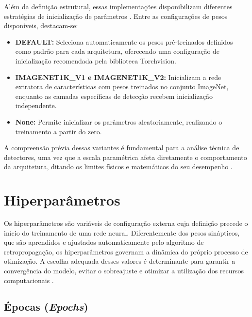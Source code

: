 Além da definição estrutural, essas implementações disponibilizam diferentes estratégias de
inicialização de parâmetros \cite{pytorch_torchvision_weights}. Entre as configurações de pesos 
disponíveis, destacam-se:

\begin{itemize}
    \item \textbf{DEFAULT:} Seleciona automaticamente os pesos pré-treinados definidos como
        padrão para cada arquitetura, oferecendo uma configuração de inicialização recomendada
        pela biblioteca Torchvision.

    \item \textbf{IMAGENET1K\_V1 e IMAGENET1K\_V2:} Inicializam a rede extratora de
        características com pesos treinados no conjunto ImageNet, enquanto as camadas
        específicas de detecção recebem inicialização independente.

    \item \textbf{None:} Permite inicializar os parâmetros aleatoriamente, realizando o
        treinamento a partir do zero.
\end{itemize}

A compreensão prévia dessas variantes é fundamental para a análise técnica de detectores,
uma vez que a escala paramétrica afeta diretamente o comportamento da arquitetura, ditando
os limites físicos e matemáticos do seu desempenho \cite{goodfellow2016deep}.

\section{Hiperparâmetros}

Os hiperparâmetros são variáveis de configuração externa cuja definição precede o início do
treinamento de uma rede neural. Diferentemente dos pesos sinápticos, que são aprendidos e
ajustados automaticamente pelo algoritmo de retropropagação, os hiperparâmetros governam a
dinâmica do próprio processo de otimização. A escolha adequada desses valores é determinante
para garantir a convergência do modelo, evitar o sobreajuste e otimizar a utilização dos
recursos computacionais \cite{goodfellow2016deep}.

\subsection{Épocas (\textit{Epochs})}

